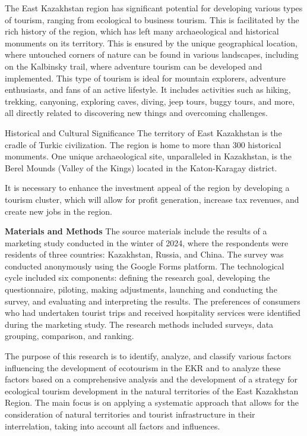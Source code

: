 The East Kazakhstan region has significant potential for developing
various types of tourism, ranging from ecological to business tourism.
This is facilitated by the rich history of the region, which has left
many archaeological and historical monuments on its territory. This is
ensured by the unique geographical location, where untouched corners of
nature can be found in various landscapes, including on the Kalbinsky
trail, where adventure tourism can be developed and implemented. This
type of tourism is ideal for mountain explorers, adventure enthusiasts,
and fans of an active lifestyle. It includes activities such as hiking,
trekking, canyoning, exploring caves, diving, jeep tours, buggy tours,
and more, all directly related to discovering new things and overcoming
challenges.

Historical and Cultural Significance The territory of East Kazakhstan is
the cradle of Turkic civilization. The region is home to more than 300
historical monuments. One unique archaeological site, unparalleled in
Kazakhstan, is the Berel Mounds (Valley of the Kings) located in the
Katon-Karagay district.

It is necessary to enhance the investment appeal of the region by
developing a tourism cluster, which will allow for profit generation,
increase tax revenues, and create new jobs in the region.

{\bfseries Materials and Methods} The source materials include the results
of a marketing study conducted in the winter of 2024, where the
respondents were residents of three countries: Kazakhstan, Russia, and
China. The survey was conducted anonymously using the Google Forms
platform. The technological cycle included six components: defining the
research goal, developing the questionnaire, piloting, making
adjustments, launching and conducting the survey, and evaluating and
interpreting the results. The preferences of consumers who had
undertaken tourist trips and received hospitality services were
identified during the marketing study. The research methods included
surveys, data grouping, comparison, and ranking.

The purpose of this research is to identify, analyze, and classify
various factors influencing the development of ecotourism in the EKR and
to analyze these factors based on a comprehensive analysis and the
development of a strategy for ecological tourism development in the
natural territories of the East Kazakhstan Region. The main focus is on
applying a systematic approach that allows for the consideration of
natural territories and tourist infrastructure in their interrelation,
taking into account all factors and influences.

